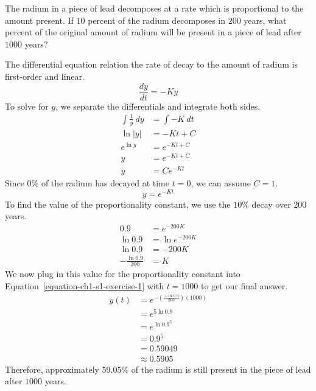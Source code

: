 \begin{exercise}
	The radium in a piece of lead decomposes at a rate which is proportional to the amount present. If $10$ percent of the radium decomposes in $200$ years, what percent of the original amount of radium will be present in a piece of lead after $1000$ years?
\end{exercise}
\begin{solution}
	The differential equation relation the rate of decay to the amount of radium is first-order and linear.
	\begin{equation*}
	\frac{dy}{dt} = -Ky
	\end{equation*}
	To solve for $y$, we separate the differentials and integrate both sides.
	\begin{align*}
	\int \frac{1}{y} \  dy &= \int -K \  dt \\
	\ln \left| y \right| &= -Kt + C \\
	e^{\ln y} &= e^{-Kt + C} \\
	y &= e^{-Kt + C} \\
	y &= Ce^{-Kt}
	\end{align*}
	Since $0\%$ of the radium has decayed at time $t = 0$, we can assume $C = 1$.
	\begin{equation}
	\label{equation-ch1-s1-exercise-1}
	y = e^{-Kt}
	\end{equation}
	To find the value of the proportionality constant, we use the $10\%$ decay over $200$ years.
	\begin{align*}
	0.9 &= e^{-200K} \\
	\ln 0.9 &= \ln e^{-200K} \\
	\ln 0.9 &= -200K \\
	-\frac{\ln 0.9}{200} &= K
	\end{align*}
	We now plug in this value for the proportionality constant into Equation~\ref{equation-ch1-s1-exercise-1} with $t = 1000$ to get our final answer.
	\begin{align*}
	y\left(t\right) &= e^{-\left(\frac{-\ln 0.9}{200}\right)\left(1000\right)} \\
	&= e^{5\ln 0.9} \\
	&= e^{\ln 0.9^5} \\
	&= 0.9^5 \\
	&= 0.59049 \\
	&\approx 0.5905
	\end{align*}
	Therefore, approximately $59.05\%$ of the radium is still present in the piece of lead after $1000$ years.
\end{solution}
